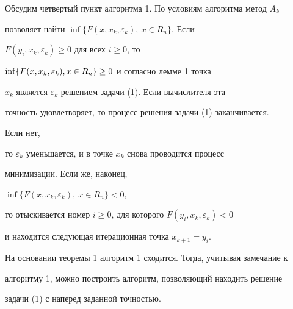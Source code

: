 \begin{notenonum}


Обсудим четвертый пункт алгоритма 1. По условиям алгоритма метод $A_k$


позволяет найти $\inf\{F(x,x_k,\varepsilon_k),\ x\in R_n\}$. Если 


$F(y_i,x_k,\varepsilon_k)\ge0$ для всех $i\ge0$, то 


$\inf\{F(x,x_k,\varepsilon_k),\linebreak


x\in R_n\}\ge0$ и согласно лемме 1 точка


$x_k$ является $\varepsilon_k$-решением задачи (1). Если вычислителя эта


точность удовлетворяет, то процесс решения задачи (1) заканчивается.


Если нет,


то $\varepsilon_k$ уменьшается, и в точке $x_k$ снова проводится процесс


минимизации. Если же, наконец,


$\inf\{F(x,x_k,\varepsilon_k),\ x\in R_n\}<0$,


то отыскивается номер $i\ge0$, для которого $F(y_i,x_k,\varepsilon_k)<0$


и находится следующая итерационная точка $x_{k+1}=y_i$.


\end{notenonum}





На основании теоремы 1 алгоритм 1 сходится. Тогда, учитывая замечание к


алгоритму 1, можно построить алгоритм, позволяющий находить решение


задачи (1) с наперед заданной точностью.





